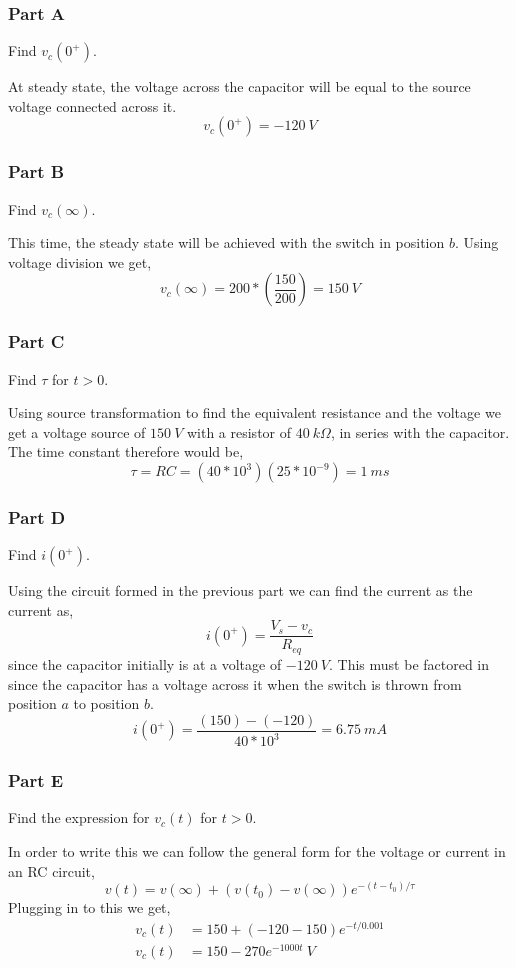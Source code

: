 \documentclass[12pt]{article}
\begin{document}
    \subsubsection*{Part A} Find $ v_c (0^+) $. \\
    \par At steady state, the voltage across the capacitor will be equal to the source voltage connected across it.
    \[
        v_c (0^+) = \boxed{-120\ V}
    \]
    \subsubsection*{Part B} Find $ v_c (\infty) $. \\
    \par This time, the steady state will be achieved with the switch in position $ b $. Using voltage division we get,
    \[
        v_c (\infty) = 200 * \left( \frac{150}{200} \right) = \boxed{150\ V}
    \]
    \subsubsection*{Part C} Find $ \tau $ for $ t > 0 $. \\
    \par Using source transformation to find the equivalent resistance and the voltage we get a voltage source of $ 150\ V $ with a resistor of $ 40\ k\Omega $, in series with the capacitor. The time constant therefore would be,
    \[
        \tau = RC = (40 * 10^{3})(25 * 10^{-9}) = \boxed{1\ ms}
    \]
    \subsubsection*{Part D} Find $ i(0^+) $. \\
    \par Using the circuit formed in the previous part we can find the current as the current as,
    \[
        i(0^+) = \frac{V_s - v_c}{R_{eq}}
    \]
    since the capacitor initially is at a voltage of $ -120\ V $. This must be factored in since the capacitor has a voltage across it when the switch is thrown from position $ a $ to position $ b $.
    \[
        i(0^+) = \frac{(150) - (-120)}{40 * 10^{3}} = \boxed{6.75\ mA}
    \]
    \subsubsection*{Part E} Find the expression for $ v_c(t) $ for $ t > 0 $. \\
    \par In order to write this we can follow the general form for the voltage or current in an RC circuit,
    \[
        v(t) = v(\infty) + (v(t_0) - v(\infty)) e^{-(t - t_0) / \tau}
    \]
    Plugging in to this we get,
    \begin{align*}
        v_c(t) &= 150 + (-120 - 150) e^{-t / 0.001} \\
        v_c(t) &= \boxed{150 - 270 e^{-1000t}\ V}
    \end{align*}
    \newpage
\end{document}
